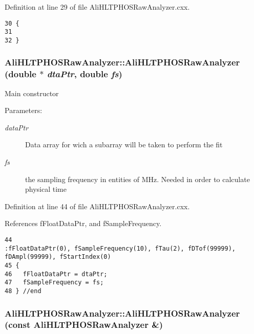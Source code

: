 Definition at line 29 of file Ali\-HLTPHOSRaw\-Analyzer.cxx.

\footnotesize\begin{verbatim}30 {
31 
32 }
\end{verbatim}\normalsize 


\subsubsection{\setlength{\rightskip}{0pt plus 5cm}Ali\-HLTPHOSRaw\-Analyzer::Ali\-HLTPHOSRaw\-Analyzer (double $\ast$ {\em dta\-Ptr}, double {\em fs})}\label{classAliHLTPHOSRawAnalyzer_AliHLTPHOSRawAnalyzera2}


Main constructor \begin{Desc}
\item[Parameters:]
\begin{description}
\item[{\em data\-Ptr}]Data array for wich a subarray will be taken to perform the fit \item[{\em fs}]the sampling frequency in entities of MHz. Needed in order to calculate physical time \end{description}
\end{Desc}


Definition at line 44 of file Ali\-HLTPHOSRaw\-Analyzer.cxx.

References f\-Float\-Data\-Ptr, and f\-Sample\-Frequency.

\footnotesize\begin{verbatim}44                                                                      :fFloatDataPtr(0), fSampleFrequency(10), fTau(2), fDTof(99999), fDAmpl(99999), fStartIndex(0)
45 {
46   fFloatDataPtr = dtaPtr;  
47   fSampleFrequency = fs;
48 } //end  
\end{verbatim}\normalsize 


\subsubsection{\setlength{\rightskip}{0pt plus 5cm}Ali\-HLTPHOSRaw\-Analyzer::Ali\-HLTPHOSRaw\-Analyzer (const {\bf Ali\-HLTPHOSRaw\-Analyzer} \&)}\label{classAliHLTPHOSRawAnalyzer_AliHLTPHOSRawAnalyzera3}





